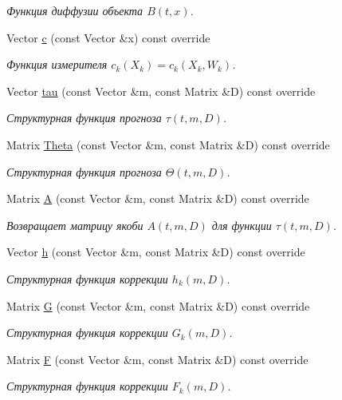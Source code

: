 \begin{DoxyCompactItemize}
\begin{DoxyCompactList}\small\item\em Функция диффузии объекта $B(t,x)$. \end{DoxyCompactList}\item 
Vector \hyperlink{class_tasks_1_1_continuous_discrete_1_1_landing_linear_aa3bddd1de01a202030bbccc1994e10af}{c} (const Vector \&x) const override
\begin{DoxyCompactList}\small\item\em Функция измерителя $c_k(X_k) = c_k(X_k, W_k)$. \end{DoxyCompactList}\item 
Vector \hyperlink{class_tasks_1_1_continuous_discrete_1_1_landing_linear_a1ee11cced65180b2a055b8ca848ef4e0}{tau} (const Vector \&m, const Matrix \&D) const override
\begin{DoxyCompactList}\small\item\em Структурная функция прогноза $\tau(t, m, D)$. \end{DoxyCompactList}\item 
Matrix \hyperlink{class_tasks_1_1_continuous_discrete_1_1_landing_linear_a783147d41d5d8dff4facd246fc064bb4}{Theta} (const Vector \&m, const Matrix \&D) const override
\begin{DoxyCompactList}\small\item\em Структурная функция прогноза $\Theta(t,m,D)$. \end{DoxyCompactList}\item 
Matrix \hyperlink{class_tasks_1_1_continuous_discrete_1_1_landing_linear_ae584bc7b596882f07b18d2a39dcdfa32}{A} (const Vector \&m, const Matrix \&D) const override
\begin{DoxyCompactList}\small\item\em Возвращает матрицу якоби $A(t, m, D)$ для функции $\tau(t, m, D)$. \end{DoxyCompactList}\item 
Vector \hyperlink{class_tasks_1_1_continuous_discrete_1_1_landing_linear_a66480881fd719faddafe5104b548db78}{h} (const Vector \&m, const Matrix \&D) const override
\begin{DoxyCompactList}\small\item\em Структурная функция коррекции $h_k(m, D)$. \end{DoxyCompactList}\item 
Matrix \hyperlink{class_tasks_1_1_continuous_discrete_1_1_landing_linear_a3b589b0ac53f7fe936438bc7c82f5c3d}{G} (const Vector \&m, const Matrix \&D) const override
\begin{DoxyCompactList}\small\item\em Структурная функция коррекции $G_k(m, D)$. \end{DoxyCompactList}\item 
Matrix \hyperlink{class_tasks_1_1_continuous_discrete_1_1_landing_linear_a5b5a327866160bf687dbc6d82a801ce8}{F} (const Vector \&m, const Matrix \&D) const override
\begin{DoxyCompactList}\small\item\em Структурная функция коррекции $F_k(m, D)$. \end{DoxyCompactList}\end{DoxyCompactItemize}
